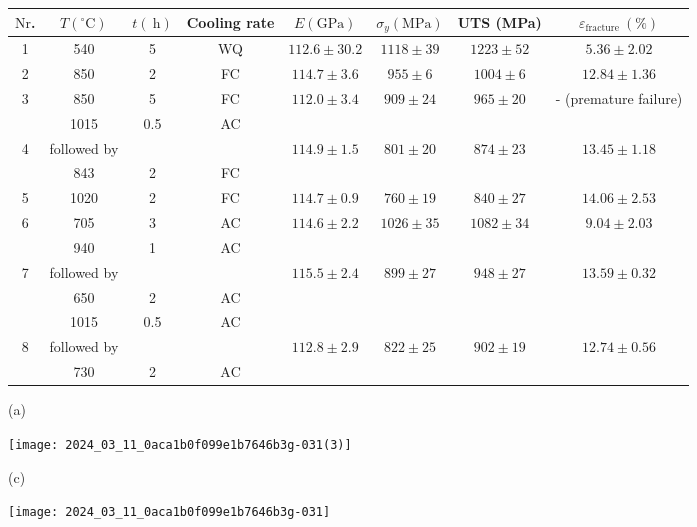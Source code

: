 \documentclass[10pt]{article}
\begin{document}
\begin{center}
\begin{tabular}{|c|c|c|c|c|c|c|c|}
\hline
$\mathrm{Nr}$. & $T\left({ }^{\circ} \mathrm{C}\right)$ & $t(\mathrm{~h})$ & Cooling rate & $E(\mathrm{GPa})$ & $\sigma_{y}(\mathrm{MPa})$ & UTS (MPa) & $\varepsilon_{\text {fracture }}(\%)$ \\
\hline
1 & 540 & 5 & WQ & $112.6 \pm 30.2$ & $1118 \pm 39$ & $1223 \pm 52$ & $5.36 \pm 2.02$ \\
\hline
2 & 850 & 2 & FC & $114.7 \pm 3.6$ & $955 \pm 6$ & $1004 \pm 6$ & $12.84 \pm 1.36$ \\
\hline
\multirow[t]{2}{*}{3} & 850 & 5 & FC & $112.0 \pm 3.4$ & $909 \pm 24$ & $965 \pm 20$ & - (premature failure) \\
\hline
 & 1015 & 0.5 & AC &  &  &  &  \\
\hline
\multirow[t]{2}{*}{4} & followed by &  &  & $114.9 \pm 1.5$ & $801 \pm 20$ & $874 \pm 23$ & $13.45 \pm 1.18$ \\
\hline
 & 843 & 2 & FC &  &  &  &  \\
\hline
5 & 1020 & 2 & FC & $114.7 \pm 0.9$ & $760 \pm 19$ & $840 \pm 27$ & $14.06 \pm 2.53$ \\
\hline
\multirow[t]{2}{*}{6} & 705 & 3 & AC & $114.6 \pm 2.2$ & $1026 \pm 35$ & $1082 \pm 34$ & $9.04 \pm 2.03$ \\
\hline
 & 940 & 1 & AC &  &  &  &  \\
\hline
\multirow[t]{3}{*}{7} & followed by &  &  & $115.5 \pm 2.4$ & $899 \pm 27$ & $948 \pm 27$ & $13.59 \pm 0.32$ \\
\hline
 & 650 & 2 & AC &  &  &  &  \\
\hline
 & 1015 & 0.5 & AC &  &  &  &  \\
\hline
\multirow[t]{2}{*}{8} & followed by &  &  & $112.8 \pm 2.9$ & $822 \pm 25$ & $902 \pm 19$ & $12.74 \pm 0.56$ \\
\hline
 & 730 & 2 & $\mathrm{AC}$ &  &  &  &  \\
\hline
\end{tabular}
\end{center}

(a)

\begin{center}
\texttt{[image: 2024\_03\_11\_0aca1b0f099e1b7646b3g-031(3)]}
\end{center}

(c)

\begin{center}
\texttt{[image: 2024\_03\_11\_0aca1b0f099e1b7646b3g-031]}
\end{center}
\end{document}
